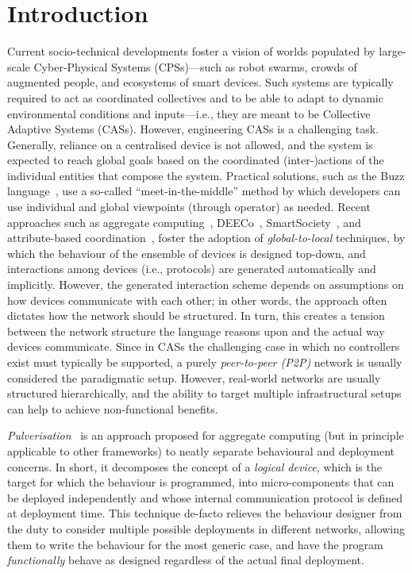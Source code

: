 \section{Introduction}

Current socio-technical developments
 foster a vision of worlds
 populated by large-scale Cyber-Physical Systems (CPSs)---such as robot swarms, 
 crowds of augmented people, and 
 ecosystems of smart devices.
%
Such systems are typically required 
 to act as coordinated collectives
 and to be able to adapt to dynamic
 environmental conditions and inputs---i.e., they are meant to be Collective Adaptive Systems (CASs).
%
However, engineering CASs is a challenging task.
%
Generally, reliance on a centralised device is not allowed,
and the system is expected to reach global goals based 
 on the coordinated (inter-)actions of the individual entities that compose the system.
Practical solutions, such as the Buzz language~\cite{DBLP:journals/computer/PinciroliB16}, use a so-called ``meet-in-the-middle'' method by which developers can use individual and global viewpoints (through  operator) as needed.
%
Recent approaches such as aggregate computing~\cite{DBLP:journals/computer/BealPV15,DBLP:journals/jlap/ViroliBDACP19}, 
 DEECo~\cite{DBLP:conf/cbse/BuresGHKKP13},
 SmartSociety~\cite{DBLP:conf/soca/ScekicMSDHCTRCD15},
 and attribute-based coordination~\cite{DBLP:journals/scp/AlrahmanNL20},
foster the adoption of \emph{global-to-local} techniques,
by which the behaviour of the ensemble of devices is designed top-down,
and interactions among devices (i.e., protocols) are generated automatically and implicitly.
%
However, the generated interaction scheme depends on assumptions on how devices communicate with each other;
in other words, the approach often dictates how the network should be structured.
%
In turn, this creates a tension between the network structure the language reasons upon and the actual way devices communicate.
%
Since in CASs the challenging case in which no controllers exist must typically be supported, a purely \emph{peer-to-peer (P2P)} network is usually considered the paradigmatic setup.
%
However, real-world networks are usually structured hierarchically, and the ability to target multiple infrastructural setups can help to achieve non-functional benefits.

\emph{Pulverisation}~\cite{DBLP:journals/fi/CasadeiPPVW20}
is an approach proposed for aggregate computing (but in principle applicable to other frameworks) to neatly separate behavioural and deployment concerns.
%
In short, it decomposes the concept of a \emph{logical device}, which is the target for which the behaviour is programmed,
into micro-components that can be deployed independently
and whose internal communication protocol is defined at deployment time.
%
This technique de-facto relieves the behaviour designer from the duty to consider multiple possible deployments in different networks,
allowing them to write the behaviour for the most generic case, and have the program \emph{functionally} behave as designed regardless of the actual final deployment.

